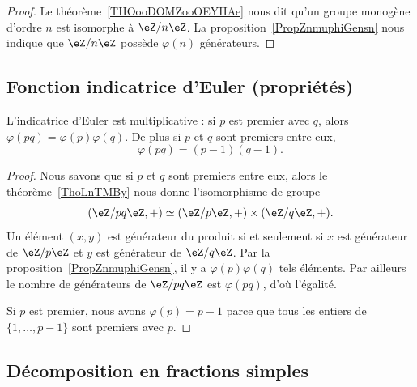 \begin{proof}
    Le théorème~\ref{THOooDOMZooOEYHAe} nous dit qu'un groupe monogène d'ordre \( n\) est isomorphe à \( \eZ/n\eZ\). La proposition~\ref{PropZnmuphiGensn} nous indique que \( \eZ/n\eZ\) possède \( \varphi(n)\) générateurs.
\end{proof}

\subsection{Fonction indicatrice d'Euler (propriétés)}
\label{subSecKGDFooAbETjs}

\begin{corollary}       \label{CorlvTmsf}
    L'indicatrice d'Euler est multiplicative : si \( p\) est premier avec \( q\), alors \( \varphi(pq)=\varphi(p)\varphi(q)\). De plus si \( p\) et \( q\) sont premiers entre eux,
    \begin{equation}
        \varphi(pq)=(p-1)(q-1).
    \end{equation}
\end{corollary}

\begin{proof}
    Nous savons que si \( p\) et \( q\) sont premiers entre eux, alors le théorème~\ref{ThoLnTMBy} nous donne l'isomorphisme de groupe
    \begin{equation}
        (\eZ/pq\eZ,+)\simeq(\eZ/p\eZ,+)\times(\eZ/q\eZ,+).
    \end{equation}
    Un élément \( (x,y)\) est générateur du produit si et seulement si \( x\) est générateur de \( \eZ/p\eZ\) et \( y\) est générateur de \( \eZ/q\eZ\). Par la proposition~\ref{PropZnmuphiGensn}, il y a \( \varphi(p)\varphi(q)\) tels éléments. Par ailleurs le nombre de générateurs de \( \eZ/pq\eZ\) est \( \varphi(pq)\), d'où l'égalité.

    Si \( p\) est premier, nous avons \( \varphi(p)=p-1\) parce que tous les entiers de \( \{ 1,\ldots, p-1 \}\) sont premiers avec \( p\).
\end{proof}

\subsection{Décomposition en fractions simples}
\label{SUBSECooSIYXooDDHUdD}



